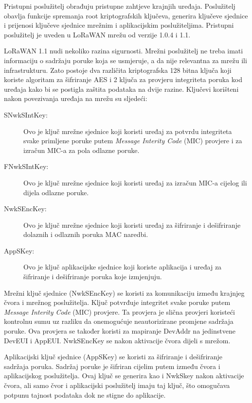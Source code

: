 \documentclass[times, utf8, diplomski]{fer}
\begin{document}
Pristupni poslužitelj obrađuju pristupne zahtjeve krajnjih uređaja. Poslužitelj obavlja funkcije spremanja root kriptografskih ključeva, generira ključeve sjednice i prijenosi ključeve sjednice mrežnim i aplikacijskim poslužiteljima. Pristupni poslužitelj je uveden u LoRaWAN mrežu od verzije 1.0.4 i 1.1.

LoRaWAN 1.1 nudi nekoliko razina sigurnosti. Mrežni poslužitelj ne treba imati informaciju o sadržaju poruke koja se usmjeruje, a da nije relevantna za mrežu ili infrastrukturu. Zato postoje dva različita kriptografska 128 bitna ključa koji koriste algoritam za šifriranje AES i 2 ključa za provjeru integriteta poruka kod uređaja kako bi se postigla zaštita podataka na dvije razine. Ključevi korišteni nakon povezivanja uređaja na mrežu su sljedeći:
\begin{description}
    \item[SNwkSIntKey:]Ovo je ključ mrežne sjednice koji koristi uređaj za potvrdu integriteta svake primljene poruke putem \emph{Message Interity Code} (MIC) provjere i za izračun MIC-a za pola odlazne poruke.
    \item[FNwkSIntKey:]Ovo je ključ mrežne sjednice koji koristi uređaj za izračun MIC-a cijelog ili dijela odlazne poruke.
    \item[NwkSEncKey:]Ovo je ključ mrežne sjednice koji koristi uređaj za šifriranje i dešifriranje dolaznih i odlaznih poruka MAC naredbi.
    \item[AppSKey:]Ovo je ključ aplikacijske sjednice koji koriste aplikacija i uređaj za šifriranje i dešifriranje poruka koje izmjenjuju.
\end{description}
Mrežni ključ sjednice (NwkSEncKey) se koristi za komunikaciju između krajnjeg čvora i mrežnog poslužitelja. Ključ potvrđuje integritet svake poruke putem \emph{Message Interity Code} (MIC) provjere. Ta provjera je slična provjeri koristeći kontrolnu sumu uz razliku da onemogućuje neautorizirane promjene sadržaja poruke. Ova provjera se također koristi za mapiranje DevAddr na jedinstvene DevEUI i AppEUI. NwkSEncKey se nakon aktivacije čvora dijeli s mrežom.

Aplikacijski ključ sjednice (AppSKey) se koristi za šifriranje i dešifriranje sadržaja poruka. Sadržaj poruke je šifriran cijelim putem između čvora i aplikacijskog poslužitelja. Ovaj ključ se generira kao i NwkSkey nakon aktivacije čvora, ali samo čvor i aplikacijski poslužitelj imaju taj ključ, što omogučava potpunu tajnost podataka dok ne stigne do aplikacije.
\end{document}
